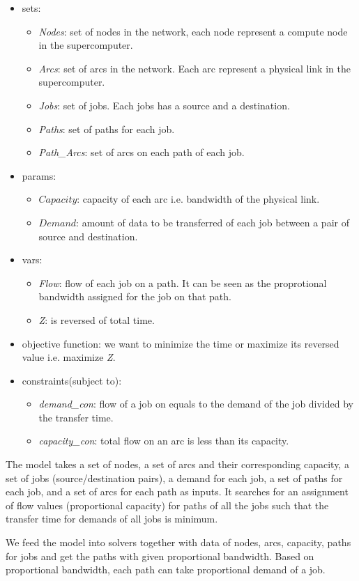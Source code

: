 \begin{itemize}
    \item sets: 
	\begin{itemize}
	    \item \textit{Nodes}: set of nodes in the network, each node represent a compute node in the supercomputer.
	    \item \textit{Arcs}: set of arcs in the network. Each arc represent a physical link in the supercomputer.
	    \item \textit{Jobs}: set of jobs. Each jobs has a source and a destination.
	    \item  \textit{Paths}: set of paths for each job.
	    \item \textit{Path\_Arcs}: set of arcs on each path of each job.
	\end{itemize}
    \item params: 
	\begin{itemize}
	    \item $Capacity$: capacity of each arc i.e. bandwidth of the physical link.
	    \item $Demand$: amount of data to be transferred of each job between a pair of source and destination.
	\end{itemize}
    \item vars:
	 \begin{itemize}
	    \item \textit{Flow}: flow of each job on a path. It can be seen as the proprotional bandwidth assigned for the job on that path.
	    \item \textit{Z}: is reversed of total time.
	\end{itemize}
    \item objective function: we want to minimize the time or maximize its reversed value i.e. maximize \textit{Z}.
    \item constraints(subject to): 
	\begin{itemize}
	    \item \textit{demand\_con}: flow of a job on equals to the demand of the job divided by the transfer time.
	    \item \textit{capacity\_con}: total flow on an arc is less than its capacity.
	\end{itemize}
\end{itemize}

The model takes a set of nodes, a set of arcs and their corresponding capacity, a set of jobs (source/destination pairs), a demand for each job, a set of paths for each job, and a set of arcs for each path as inputs. It searches for an assignment of flow values (proportional capacity) for paths of all the jobs such that the transfer time for demands of all jobs is minimum.

We feed the model into solvers together with data of nodes, arcs, capacity, paths for jobs and get the paths with given proportional bandwidth. Based on proportional bandwidth, each path can take proportional demand of a job.
